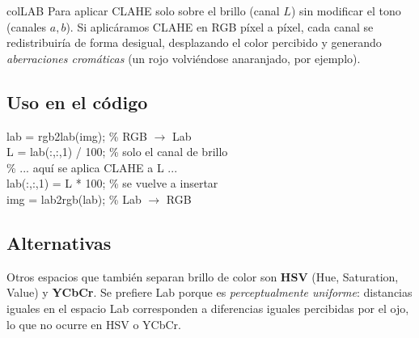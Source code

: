 \documentclass[11pt,a4paper]{article}
\begin{document}
\begin{keybox}{colLAB}
Para aplicar CLAHE solo sobre el brillo (canal \(L\)) sin modificar el tono
(canales \(a, b\)). Si aplicáramos CLAHE en RGB píxel a píxel, cada canal se
redistribuiría de forma desigual, desplazando el color percibido y generando
\emph{aberraciones cromáticas} (un rojo volviéndose anaranjado, por ejemplo).

\subsection*{Uso en el código}

\begin{codebox}
lab = rgb2lab(img);       \% RGB $\to$ Lab \\
L = lab(:,:,1) / 100;     \% solo el canal de brillo \\
\% ... aquí se aplica CLAHE a L ... \\
lab(:,:,1) = L * 100;     \% se vuelve a insertar \\
img = lab2rgb(lab);       \% Lab $\to$ RGB
\end{codebox}

\subsection*{Alternativas}

Otros espacios que también separan brillo de color son \textbf{HSV} (Hue,
Saturation, Value) y \textbf{YCbCr}. Se prefiere Lab porque es
\emph{perceptualmente uniforme}: distancias iguales en el espacio Lab
corresponden a diferencias iguales percibidas por el ojo, lo que no ocurre en
HSV o YCbCr.

\end{keybox}

\end{document}
